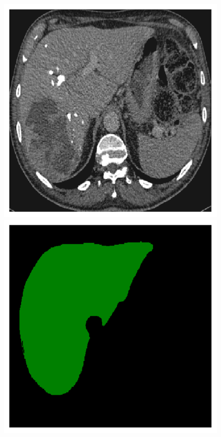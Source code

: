\begin{figure}[!ht]
	\centering
	\begin{minipage}{4cm}
		\includegraphics[width=\linewidth]{images/ResizeLiverVE_Raw_Pat0_3}
	\end{minipage} \hspace{-0.3cm}
	\begin{minipage}{4cm}
		\includegraphics[width=\linewidth]{images/ResizeLiverVE_GT_Pat0_3}

\end{minipage}
\end{figure}
